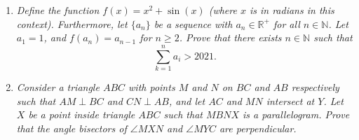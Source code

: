 \documentclass{article}
\begin{document}
\begin{enumerate}[1.]
\begin{proof}
	Since all of the prime factors of $m$ are also factors of $n$ (they are either $p$, which is a factor of $n$, or a prime factor of $b$, thus a factor of $a$, thus a factor of $n$) we see that the desired result holds true for $n$ as well. By the principle of strong mathematical induction, we have that the lemma is true for all sufficiently factorial-like natural numbers $n$.
\end{proof}


\vspace{24pt}
\item %
{\itshape Define the function $f(x) = x^2 + \sin(x)$ (where $x$ is in radians in this context). Furthermore, let $\{a_n\}$ be a sequence with $a_n \in \mathbb{R}^+$ for all $n \in \mathbb{N}$. Let $a_1 = 1$, and $f(a_n) = a_{n - 1}$ for $n \ge 2$. Prove that there exists $n \in \mathbb{N}$ such that 
$$\sum_{k = 1}^n a_i > 2021.$$}


\vspace{24pt}
\item %
{\itshape Consider a triangle $ABC$ with points $M$ and $N$ on $BC$ and $AB$ respectively such that $AM \perp BC$ and $CN \perp AB$, and let $AC$ and $MN$ intersect at $Y$.
Let $X$ be a point inside triangle $ABC$ such that $MBNX$ is a parallelogram.
Prove that the angle bisectors of $\angle MXN$ and $\angle MYC$ are perpendicular.}


\end{enumerate}
\end{document}
